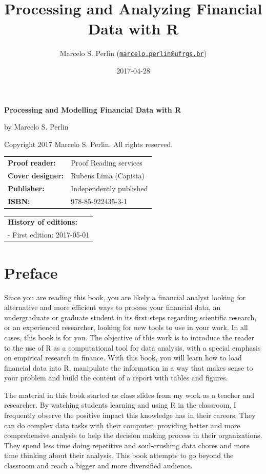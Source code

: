 \documentclass[11pt,]{book}
\title{Processing and Analyzing Financial Data with R}
\author{Marcelo S. Perlin
(\href{mailto:marcelo.perlin@ufrgs.br}{\nolinkurl{marcelo.perlin@ufrgs.br}})}
\date{2017-04-28}
\begin{document}
\maketitle

\thispagestyle{empty}

\textbf{Processing and Modelling Financial Data with R}

by Marcelo S. Perlin

Copyright \textcopyright{} 2017 Marcelo S. Perlin. All rights reserved.

\vspace{0.75cm}

\begin{tabular}{l l}
	\textbf{Proof reader:} & Proof Reading services  \\
	\textbf{Cover designer:} & Rubens Lima (Capista)  \\
	\textbf{Publisher:} & Independently published \\
	\textbf{ISBN:} & 978-85-922435-3-1 \\
\end{tabular}

\vspace{0.5cm}

\begin{tabular}{l }
	\textbf{History of editions:} \\
	  {   - First edition: 2017-05-01}
\end{tabular}

{
\setcounter{tocdepth}{2}
\tableofcontents
}
\chapter*{Preface}\label{preface}

Since you are reading this book, you are likely a financial analyst
looking for alternative and more efficient ways to process your
financial data, an undergraduate or graduate student in its first steps
regarding scientific research, or an experienced researcher, looking for
new tools to use in your work. In all cases, this book is for you. The
objective of this work is to introduce the reader to the use of R as a
computational tool for data analysis, with a special emphasis on
empirical research in finance. With this book, you will learn how to
load financial data into R, manipulate the information in a way that
makes sense to your problem and build the content of a report with
tables and figures.

The material in this book started as class slides from my work as a
teacher and researcher. By watching students learning and using R in the
classroom, I frequently observe the positive impact this knowledge has
in their careers. They can do complex data tasks with their computer,
providing better and more comprehensive analysis to help the decision
making process in their organizations. They spend less time doing
repetitive and soul-crushing data chores and more time thinking about
their analysis. This book attempts to go beyond the classroom and reach
a bigger and more diversified audience.
\end{document}
